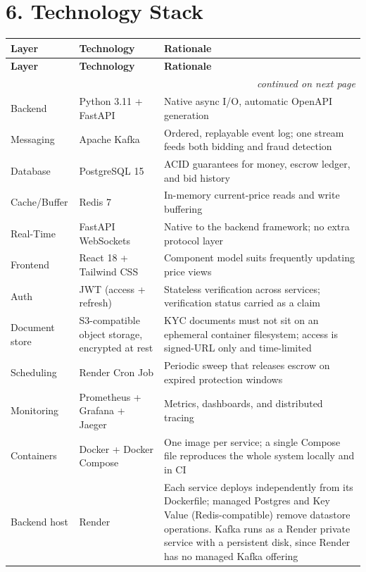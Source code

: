 \documentclass[11pt, a4paper]{article}
\newcommand{\secgap}{\vspace{0.06in}}
\begin{document}
\secgap
\newpage
\section*{6. Technology Stack}
{\small
\begin{longtable}{@{}l p{1.4in} p{2.95in}@{}}
\toprule
\textbf{Layer} & \textbf{Technology} & \textbf{Rationale} \\
\midrule
\endfirsthead
\toprule
\textbf{Layer} & \textbf{Technology} & \textbf{Rationale} \\
\midrule
\endhead
\midrule
\multicolumn{3}{r}{\footnotesize\emph{continued on next page}}\\
\endfoot
\bottomrule
\endlastfoot
Backend      & Python 3.11 + FastAPI      & Native async I/O, automatic OpenAPI generation \\
Messaging    & Apache Kafka               & Ordered, replayable event log; one stream feeds both bidding and fraud detection \\
Database     & PostgreSQL 15              & ACID guarantees for money, escrow ledger, and bid history \\
Cache/Buffer & Redis 7                    & In-memory current-price reads and write buffering \\
Real-Time    & FastAPI WebSockets         & Native to the backend framework; no extra protocol layer \\
Frontend     & React 18 + Tailwind CSS    & Component model suits frequently updating price views \\
Auth         & JWT (access + refresh)     & Stateless verification across services; verification status carried as a claim \\
Document store & S3-compatible object storage, encrypted at rest & KYC documents must not sit on an ephemeral container filesystem; access is signed-URL only and time-limited \\
Scheduling   & Render Cron Job            & Periodic sweep that releases escrow on expired protection windows \\
Monitoring   & Prometheus + Grafana + Jaeger & Metrics, dashboards, and distributed tracing \\
Containers   & Docker + Docker Compose    & One image per service; a single Compose file reproduces the whole system locally and in CI \\
Backend host & Render                     & Each service deploys independently from its Dockerfile; managed Postgres and Key Value (Redis-compatible) remove datastore operations. Kafka runs as a Render private service with a persistent disk, since Render has no managed Kafka offering \\

\end{longtable}}
\end{document}
